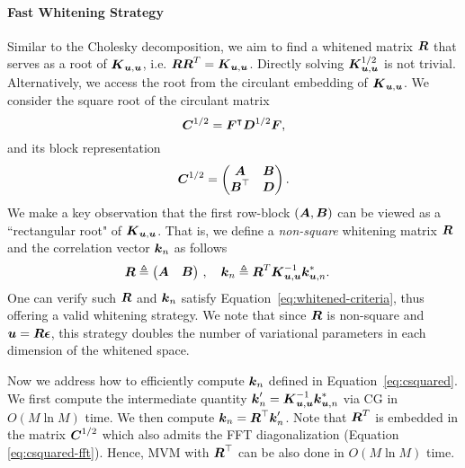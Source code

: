 \paragraph{Fast Whitening Strategy}
\label{sec:toeplitz-whitening}
Similar to the Cholesky decomposition, we aim to
find a whitened matrix $\boldsymbol{R}$ that serves as a root of $\boldsymbol{K}_{\boldsymbol{u}, \boldsymbol{u}}$,
i.e. $\boldsymbol{R} \boldsymbol{R}^T = \boldsymbol{K}_{\boldsymbol{u}, \boldsymbol{u}}$.
Directly solving $\boldsymbol{K}_{\boldsymbol{u}, \boldsymbol{u}}^{1/2}$ is not trivial. Alternatively, we access the root from the circulant embedding of $\boldsymbol{K}_{\boldsymbol{u}, \boldsymbol{u}}$.  We consider the square root of the circulant matrix
\begin{equation}\label{eq:csquared-fft}
  \boldsymbol{C}^{1/2} = \boldsymbol{F}^\intercal \boldsymbol{D}^{1/2} \boldsymbol{F},
\end{equation}
and its block representation
\begin{equation}
  \boldsymbol{C}^{1/2} = \begin{pmatrix}
  \boldsymbol{A} & \boldsymbol{B} \\
  \boldsymbol{B}^\top & \boldsymbol{D} \\
\end{pmatrix}.
\end{equation}
We make a key observation that the first row-block $(\boldsymbol{A}, \boldsymbol{B})$ can be viewed as a
``rectangular root" of $\boldsymbol{K}_{\boldsymbol{u}, \boldsymbol{u}}$. That is, we define a
 \emph{non-square} whitening matrix $\boldsymbol{R}$ and the correlation vector $\boldsymbol{k}_n$ as follows 
\begin{align}\label{eq:csquared}
\boldsymbol{R} &\triangleq \begin{pmatrix}
\boldsymbol{A} & \boldsymbol{B}
\end{pmatrix} \,, \quad \boldsymbol{k}_n \triangleq \boldsymbol{R}^T \boldsymbol{K}_{\boldsymbol{u}, \boldsymbol{u}}^{-1} \boldsymbol{k}^*_{\boldsymbol{u}, n}.
\end{align}
One can verify such $\boldsymbol{R}$ and $\boldsymbol{k}_n$ satisfy
Equation~\ref{eq:whitened-criteria}, thus offering a valid whitening strategy.
We note that since $\boldsymbol{R}$ is non-square and $\boldsymbol{u} = \boldsymbol{R} \boldsymbol{\epsilon}$,
this strategy doubles the number of variational parameters
in each dimension of the whitened space.

Now we address how to efficiently compute $\boldsymbol{k}_n$  defined in Equation~\ref{eq:csquared}. We first compute the intermediate quantity $\boldsymbol{k}_n'= \boldsymbol{K}_{\boldsymbol{u}, \boldsymbol{u}}^{-1} \boldsymbol{k}^*_{\boldsymbol{u}, n}$ via CG in $O(M \ln M)$ time. We then compute $\boldsymbol{k}_n = \boldsymbol{R}^\top \boldsymbol{k}_n'$. Note that $\boldsymbol{R}^{T}$ is embedded in the matrix $\boldsymbol{C}^{1/2}$ which also admits the FFT diagonalization (Equation \ref{eq:csquared-fft}). Hence,  MVM with $\boldsymbol{R}^\top$ can be also done in $O(M \ln M)$ time.  

